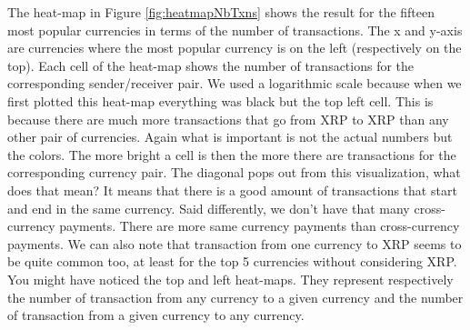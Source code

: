The heat-map in Figure \ref{fig:heatmapNbTxns} shows the result for the fifteen most popular currencies in terms of the number of transactions. The x and y-axis are currencies where the most popular currency is on the left (respectively on the top). Each cell of the heat-map shows the number of transactions for the corresponding sender/receiver pair. We used a logarithmic scale because when we first plotted this heat-map everything was black but the top left cell. This is because there are much more transactions that go from XRP to XRP than any other pair of currencies. Again what is important is not the actual numbers but the colors. The more bright a cell is then the more there are transactions for the corresponding currency pair. The diagonal pops out from this visualization, what does that mean? It means that there is a good amount of transactions that start and end in the same currency. Said differently, we don't have that many cross-currency payments. There are more same currency payments than cross-currency payments. We can also note that transaction from one currency to XRP seems to be quite common too, at least for the top 5 currencies without considering XRP. You might have noticed the top and left heat-maps. They represent respectively the number of transaction from any currency to a given currency and the number of transaction from a given currency to any currency.

